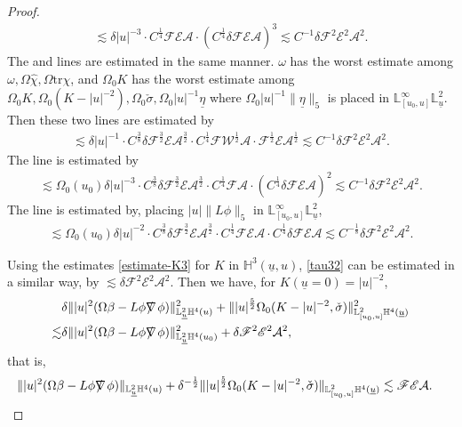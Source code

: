 \documentclass[11pt,reqno]{amsart}
\theoremstyle{definition}
\numberwithin{equation}{section}
\newcommand{\tr}{\mathrm{tr}}
\renewcommand{\L}{\mathbb{L}}
\renewcommand{\H}{\mathbb{H}}
\def\chih{\widehat{\chi}}
\def\etab{\underline{\eta}}
\def\tr{\mathrm{tr}}
\def\sigmac{\check{\sigma}}
\def\ub{\underline{u}}
\def\nablas{\mbox{$\nabla \mkern -13mu /$ }}
\begin{document}
\begin{proof}
\begin{align*}
\lesssim\delta|u|^{-3}\cdot C^{\frac{1}{4}}\mathscr{F}\mathscr{E}\mathcal{A}\cdot  (C^{\frac{1}{4}}\delta\mathscr{F}\mathscr{E}\mathcal{A})^3\lesssim C^{-1}\delta\mathscr{F}^2\mathscr{E}^2\mathcal{A}^2.
\end{align*}
The  and  lines are estimated in the same manner. $\omega$ has the worst estimate among $\omega,\Omega\chih,\Omega\tr\chi$, and $\Omega_0K$ has the worst estimate among $\Omega_0K,\Omega_0(K-|u|^{-2}),\Omega_0\sigmac,\Omega_0|u|^{-1}\etab$ where $\Omega_0|u|^{-1}\|\etab\|_5$ is placed in $\L^\infty_{[u_0,u]}\L^2_{\ub}$. Then these two lines are estimated by
\begin{align*}
\lesssim\delta|u|^{-1}\cdot C^{\frac{3}{8}}\delta\mathscr{F}^{\frac{3}{2}}\mathscr{E}\mathcal{A}^{\frac{3}{2}}\cdot C^{\frac{1}{4}}\mathscr{F}\mathscr{W}^{\frac{1}{2}}\mathcal{A}\cdot\mathscr{F}^{\frac{1}{2}}\mathscr{E}\mathcal{A}^{\frac{1}{2}}\lesssim C^{-1}\delta\mathscr{F}^2\mathscr{E}^2\mathcal{A}^2.
\end{align*}
The  line is estimated by
\begin{align*}
\lesssim\Omega_0(u_0)\delta|u|^{-3}\cdot C^{\frac{3}{8}}\delta\mathscr{F}^{\frac{3}{2}}\mathscr{E}\mathcal{A}^{\frac{3}{2}}\cdot C^{\frac{1}{4}}\mathscr{F}\mathcal{A}\cdot (C^{\frac{1}{4}}\delta\mathscr{F}\mathscr{E}\mathcal{A})^2\lesssim C^{-1}\delta\mathscr{F}^2\mathscr{E}^2\mathcal{A}^2.
\end{align*}
The  line is estimated by, placing $|u|\|L\phi\|_5$ in $\L^\infty_{[u_0,u]}\L^2_{\ub}$,
\begin{align*}
\lesssim\Omega_0(u_0)\delta|u|^{-2}\cdot C^{\frac{3}{8}}\delta\mathscr{F}^{\frac{3}{2}}\mathscr{E}\mathcal{A}^{\frac{3}{2}}\cdot C^{\frac{1}{4}}\mathscr{F}\mathscr{E}\mathcal{A}\cdot C^{\frac{1}{4}}\delta\mathscr{F}\mathscr{E}\mathcal{A}\lesssim C^{-\frac{1}{8}}\delta\mathscr{F}^2\mathscr{E}^2\mathcal{A}^2.
\end{align*}


Using the estimates \eqref{estimate-K3} for $K$ in $\H^3(\ub,u)$, \eqref{tau32} can be estimated in a similar way, by $\lesssim\delta\mathscr{F}^2\mathscr{E}^2\mathcal{A}^2$. Then we have, for $K(\ub=0)=|u|^{-2}$,
\begin{equation*}
\begin{split}
&\delta\||u|^2(\Omega\beta-L\phi\nablas\phi)\|_{\L^2_{\ub}\H^4(u)}^2+\||u|^{\frac{5}{2}}\Omega_0(K-|u|^{-2},\check{\sigma})\|_{\L^2_{[u_0,u]}\H^4(\ub)}^2\\
\lesssim&\delta\||u|^2(\Omega\beta-L\phi\nablas\phi)\|_{\L^2_{\ub}\H^4(u_0)}^2+\delta\mathscr{F}^2\mathscr{E}^2\mathcal{A}^2,
\end{split}
\end{equation*}
that is,
\begin{equation}\label{estimate-beta}
\begin{split}
&\||u|^2(\Omega\beta-L\phi\nablas\phi)\|_{\L^2_{\ub}\H^4(u)}+\delta^{-\frac{1}{2}}\||u|^{\frac{5}{2}}\Omega_0(K-|u|^{-2},\check{\sigma})\|_{\L^2_{[u_0,u]}\H^4(\ub)}\lesssim\mathscr{F}\mathscr{E}\mathcal{A}.
\end{split}
\end{equation}


\end{proof}
\end{document}
